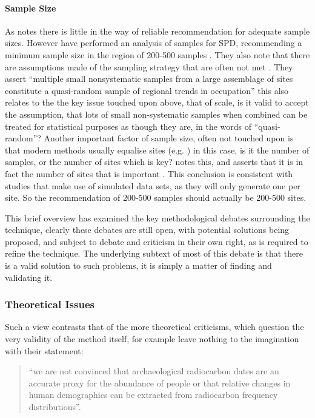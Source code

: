 \paragraph{Sample Size}
As \citet[142]{BROWN2015133} notes there is little in the way of reliable recommendation for adequate sample sizes. However \citet{Williams2012578} have performed an analysis of samples for SPD, recommending a minimum sample size in the region of 200-500 samples \citep[580]{Williams2012578}. They also note that there are assumptions made of the sampling strategy that are often not met \citep[593]{Williams2012578}. They assert  ``multiple small nonsystematic samples from a large assemblage of sites constitute a quasi-random sample of regional trends in occupation'' \citep[580]{Williams2012578} this also relates to the the key issue touched upon above, that of scale, is it valid to accept the assumption, that lots of small non-systematic samples when combined can be treated for statistical purposes as though they are, in the words of \citep{Williams2012578} ``quasi-random''? Another important factor of sample size, often not touched upon is that modern methods usually equalise sites (e.g. \citealp{TIMPSON2014549}) in this case, is it the number of samples, or the number of sites which is key? \citet{Torfing2015193} notes this, and asserts that it is in fact the number of sites that is important \citep[197]{Torfing2015193}. This conclusion is consistent with studies that make use of simulated data sets, as they will only generate one per site. So the recommendation of 200-500 samples should actually be 200-500 sites.

This brief overview has examined the key methodological debates surrounding the technique, clearly these debates are still open, with potential solutions being proposed, and subject to debate and criticism in their own right, as is required to refine the technique. The underlying subtext of most of this debate is that there is a valid solution to such problems, it is simply a matter of finding and validating it.

\subsubsection{Theoretical Issues}
Such a view contrasts that of the more theoretical criticisms, which question the very validity of the method itself, for example \citet[1321]{BALLENGER20111314} leave nothing to the imagination with their statement: \begin{quote}``we are not convinced that archaeological radiocarbon dates are an accurate proxy for the abundance of people or that relative changes in human demographics can be extracted from radiocarbon frequency distributions''.\end{quote}

